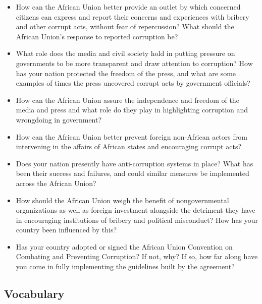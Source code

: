 \documentclass[10pt, letterpaper]{article}
\begin{document}
\begin{itemize}
\item
How can the African Union better provide an outlet by which concerned
citizens can express and report their concerns and experiences with
bribery and other corrupt acts, without fear of repercussion? What
should the African Union's response to reported corruption be? 
\item
What role does the media and civil society hold in putting pressure on
governments to be more transparent and draw attention to corruption? How
has your nation protected the freedom of the press, and what are some
examples of times the press uncovered corrupt acts by government
officials? 
\item
How can the African Union assure the independence and freedom of the
media and press and what role do they play in highlighting corruption
and wrongdoing in government? 
\item
How can the African Union better prevent foreign non-African actors from
intervening in the affairs of African states and encouraging corrupt
acts? 
\item
Does your nation presently have anti-corruption systems in place? What
has been their success and failures, and could similar measures be
implemented across the African Union? 
\item
How should the African Union weigh the benefit of nongovernmental
organizations as well as foreign investment alongside the detriment they
have in encouraging institutions of bribery and political misconduct?
How has your country been influenced by this? 
\item
Has your country adopted or signed the African Union Convention on
Combating and Preventing Corruption? If not, why? If so, how far along
have you come in fully implementing the guidelines built by the
agreement? 
\end{itemize}

\subsection{Vocabulary}
\end{document}
